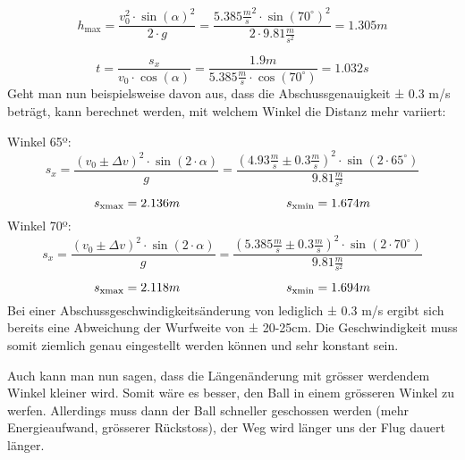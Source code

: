 \[ h_\text{max} = \frac{v_0^2 \cdot \sin(\alpha)^2}{2 \cdot g} 
= \frac{5.385 \frac{m}{s}^2 \cdot \sin(70^\circ)^2}{2 \cdot 9.81 \frac{m}{s^2}} 
= 1.305m \]

\[ t = \frac{s_x}{v_0 \cdot \cos(\alpha)} 
= \frac{1.9m}{5.385 \frac{m}{s} \cdot \cos(70^\circ)} = 1.032s \]
%
Geht man nun beispielsweise davon aus, dass die Abschussgenauigkeit ± 0.3 m/s 
beträgt, kann berechnet werden, mit welchem Winkel die Distanz mehr variiert:

\noindent
Winkel 65º:
%
\[ s_x = \frac{(v_0 \pm \Delta v)^2 \cdot \sin(2 \cdot \alpha)}{g} 
= \frac{(4.93 \frac{m}{s} \pm 0.3 \frac{m}{s})^2 \cdot \sin(2 \cdot 65^\circ)}{9.81 \frac{m}{s^2}} \]

\[ s_\text{xmax} = 2.136m \hspace{30mm} s_\text{xmin} = 1.674m \]
%
Winkel 70º:
%
\[ s_x = \frac{(v_0 \pm \Delta v)^2 \cdot \sin(2 \cdot \alpha)}{g} 
= \frac{(5.385 \frac{m}{s} \pm 0.3 \frac{m}{s})^2 \cdot \sin(2 \cdot 70^\circ)}{9.81 \frac{m}{s^2}} \]

\[ s_\text{xmax} = 2.118m \hspace{30mm} s_\text{xmin} = 1.694m \]
%
Bei einer Abschussgeschwindigkeitsänderung von lediglich ± 0.3 m/s ergibt sich 
bereits eine Abweichung der Wurfweite von ± 20-25cm. Die Geschwindigkeit muss 
somit ziemlich genau eingestellt werden können und sehr konstant sein.

\noindent
Auch kann man nun sagen, dass die Längenänderung mit grösser werdendem Winkel 
kleiner wird. Somit wäre es besser, den Ball in einem grösseren Winkel zu 
werfen. Allerdings muss dann der Ball schneller geschossen werden (mehr 
Energieaufwand, grösserer Rückstoss), der Weg wird länger uns der Flug dauert 
länger.
